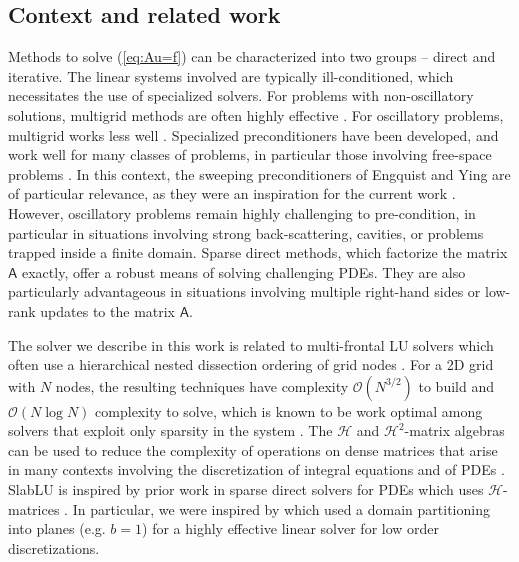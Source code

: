 \documentclass[11pt]{amsart}
\newcommand{\mtx}[1]{\bm{\mathsf{#1}}}
\begin{document}
\subsection{Context and related work}

Methods to solve (\ref{eq:Au=f}) can be characterized into two groups -- direct and iterative. 
The linear systems involved are typically ill-conditioned, which necessitates the use of specialized solvers. 
For problems with non-oscillatory solutions, multigrid methods are often highly effective
\cite{mccormick_multigrid,1987_ruge_algebraic,2017_xu_algebraic}.
For oscillatory problems, multigrid works less well \cite{ernst2012difficult}. 
Specialized preconditioners have been developed, and work well for many classes of problems, in particular those involving free-space problems \cite{gander2019class,gander2007optimized,erlangga2004class,erlangga2006comparison}.
In this context, the sweeping preconditioners of Engquist and Ying are of particular relevance, as they were an inspiration for the current work \cite{2011_engquist_ying,2011_engquist_ying_PML}.
However, oscillatory problems remain highly challenging to pre-condition, in particular in situations involving strong back-scattering, cavities, or problems trapped inside a finite domain.
Sparse direct methods, which factorize the matrix $\mtx A$ exactly, offer a robust means of solving challenging PDEs. 
They are also particularly advantageous in situations involving multiple right-hand sides or low-rank updates to the matrix $\mtx A$.

The solver we describe in this work is related to multi-frontal LU solvers \cite{2016_acta_sparse_direct_survey}
which often use a hierarchical nested dissection ordering of grid nodes \cite{amestoy1996approximate,george_1973}.
For a 2D grid with $N$ nodes,
the resulting techniques have complexity $\mathcal O(N^{3/2})$ to build and $\mathcal O(N\log N)$ complexity to solve, which is known
to be work optimal among solvers that exploit only sparsity in the system 
\cite{2006_davis_directsolverbook,1989_directbook_duff}. 
The $\mathcal H$ and $\mathcal H^2$-matrix algebras can be used to reduce the complexity of operations on dense matrices that arise in 
many contexts involving the discretization of integral equations and of PDEs \cite{2008_bebendorf_book,2003_borm_introduction_H_matrix,hackbusch2015hierarchical}. 
SlabLU is inspired by prior work in sparse direct solvers for PDEs which uses $\mathcal H$-matrices \cite{amestoy2017complexity,2018_chavez_accelerated,2016_ghysels_randomized_multifrontal,2009_xia_superfast,gillman2014direct,2017_pichon_sparse}. In particular, we were inspired by \cite{2018_chavez_accelerated}
which used a domain partitioning into planes (e.g. $b=1$) for a highly effective linear solver for low order discretizations.
\end{document}
